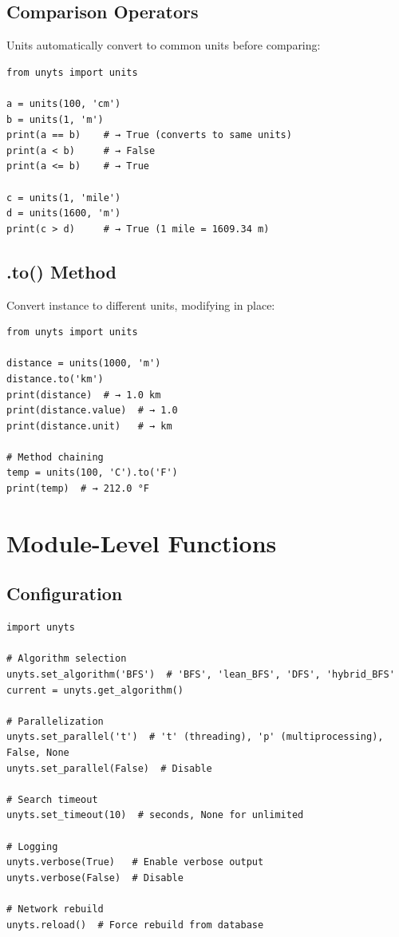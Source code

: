 \documentclass[11pt,a4paper]{report}
\begin{document}
\subsection{Comparison Operators}

Units automatically convert to common units before comparing:

\begin{lstlisting}[style=pythonstyle]
from unyts import units

a = units(100, 'cm')
b = units(1, 'm')
print(a == b)    # → True (converts to same units)
print(a < b)     # → False
print(a <= b)    # → True

c = units(1, 'mile')
d = units(1600, 'm')
print(c > d)     # → True (1 mile = 1609.34 m)
\end{lstlisting}

\subsection{.to() Method}

Convert instance to different units, modifying in place:

\begin{lstlisting}[style=pythonstyle]
from unyts import units

distance = units(1000, 'm')
distance.to('km')
print(distance)  # → 1.0 km
print(distance.value)  # → 1.0
print(distance.unit)   # → km

# Method chaining
temp = units(100, 'C').to('F')
print(temp)  # → 212.0 °F
\end{lstlisting}

\section{Module-Level Functions}

\subsection{Configuration}

\begin{lstlisting}[style=pythonstyle]
import unyts

# Algorithm selection
unyts.set_algorithm('BFS')  # 'BFS', 'lean_BFS', 'DFS', 'hybrid_BFS'
current = unyts.get_algorithm()

# Parallelization
unyts.set_parallel('t')  # 't' (threading), 'p' (multiprocessing), False, None
unyts.set_parallel(False)  # Disable

# Search timeout
unyts.set_timeout(10)  # seconds, None for unlimited

# Logging
unyts.verbose(True)   # Enable verbose output
unyts.verbose(False)  # Disable

# Network rebuild
unyts.reload()  # Force rebuild from database
\end{lstlisting}
\end{document}

